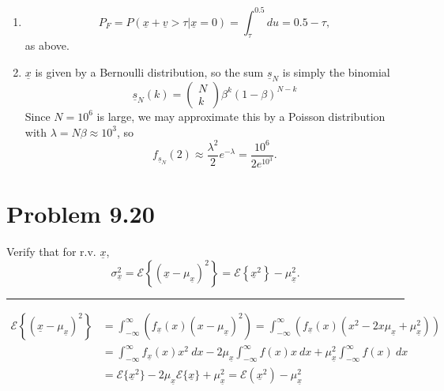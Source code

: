 \documentclass{article}
\newcommand{\horline}
           {\begin{center}
              \noindent\rule{8cm}{0.4pt}
            \end{center}}
\begin{document}
\begin{enumerate}[label=(\roman*)]
{       }
   \item{
     $$
     P_F = P(\underline{x} + \underline{v} > \tau | \underline{x} = 0) 
        = \int_\tau^{0.5} du = 0.5 - \tau,
     $$
     as above.
    }
    \item{
     $\underline{x}$ is given by a Bernoulli distribution, so the sum
     $\underline{s}_N$ is simply the binomial
     $$
     \underline{s}_{N}(k) =
       \left(\begin{array}{c}N\\k\end{array}\right)
       \beta^k (1 - \beta)^{N-k}
     $$
     Since $N = 10^6$ is large, we may approximate this by a Poisson
     distribution with $\lambda = N\beta \approx 10^3$, so 
     $$
     f_{\underline{s}_N}(2) \approx \frac{\lambda^2}{2}e^{-\lambda}
                            = \frac{10^6}{2e^{10^3}}.  
     $$
     }
\end{enumerate}

\section*{Problem 9.20}
Verify that for r.v. $\underline{x}$, 
$$
\sigma_{\underline{x}}^2 = 
  \mathcal{E}\left\{(\underline{x} - \mu_{\underline{x}})^2\right\} = 
  \mathcal{E}\left\{\underline{x}^2\right\} - \mu_{\underline{x}}^2.
$$
\horline
\begin{align*}
\mathcal{E}\left\{(\underline{x} - \mu_{\underline{x}})^2\right\} &=
  \int_{-\infty}^\infty \left(f_{\underline{x}}(x)(x
                        - \mu_{\underline{x}})^2\right)
   = \int_{-\infty}^\infty \left(f_{\underline{x}}(x)
           (x^2 - 2x \mu_{\underline{x}} + \mu_{\underline{x}}^2)\right) \\ 
  &= \int_{-\infty}^\infty f_{\underline{x}}(x) x^2 ~dx 
   - 2\mu_{\underline{x}} \int_{-\infty}^\infty f(x) x ~dx
   + \mu_{\underline{x}}^2 \int_{-\infty}^\infty f(x) ~dx \\
  &= \mathcal{E}\{\underline{x}^2\} 
   - 2\mu_{\underline{x}} \mathcal{E}\{\underline{x}\}
   + \mu_{\underline{x}}^2 
   = \mathcal{E}(\underline{x}^2) - \mu_{\underline{x}}^2
\end{align*}
\end{document}
